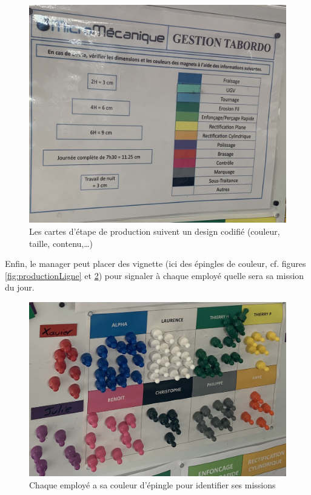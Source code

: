 \begin{figure}[!h]
    \centering
    \includegraphics[scale=0.2]{img/productionStep.jpg}
    \caption{Les cartes d'étape de production suivent un design codifié (couleur, taille, contenu,\dots)}
    \label{fig:productionStep}
\end{figure}

Enfin, le manager peut placer des vignette (ici des épingles de couleur, cf. figures \ref{fig:productionLigne} et \ref{fig:employee}) pour signaler à chaque employé quelle sera sa mission du jour.

\begin{figure}[!h]
    \centering
    \includegraphics[scale=0.15]{img/employee.jpg}
    \caption{Chaque employé a sa couleur d'épingle pour identifier ses missions}
    \label{fig:employee}
\end{figure}

